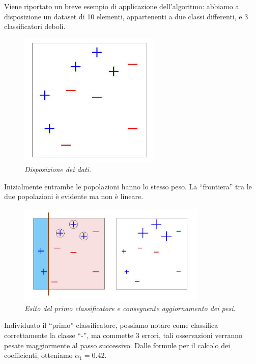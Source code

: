 \newpage
\vspace{1.5cm}

Viene riportato un breve esempio di applicazione dell'algoritmo:
abbiamo a disposizione un dataset di 10 elementi, appartenenti a due classi differenti, e 3 classificatori deboli.


\begin{figure}[!h]
\centering
\includegraphics[width=0.6\textwidth]{esempio_adaboost1.png}%
 \caption{\textit{Disposizione dei dati.}}
 \label{grafico1}
\end{figure}
Inizialmente entrambe le popolazioni hanno lo stesso peso. La ``frontiera'' tra le due popolazioni \`e evidente ma non \`e lineare.
\begin{figure}[!h]
\centering
\includegraphics[width=0.8\textwidth]{esempio_adaboost2.png}%
 \caption{\textit{Esito del primo classificatore e conseguente aggiornamento dei pesi.}}
 \label{grafico2}
\end{figure}
\newpage
Individuato il ``primo'' classificatore, possiamo notare come classifica correttamente la classe ``-'', ma commette 3 errori, tali osservazioni verranno
pesate maggiormente al passo successivo. Dalle formule per il calcolo dei coefficienti, 
otteniamo \begin{math}\alpha_1=0.42\end{math}.


